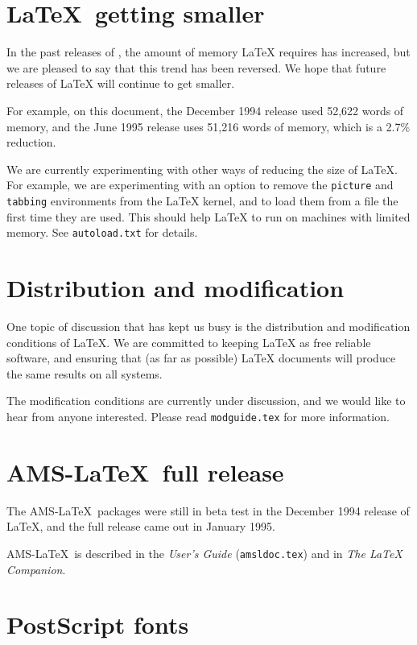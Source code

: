 \documentclass{ltnews}
\providecommand\env[1]{\texttt{#1}}
\providecommand\file[1]{\texttt{#1}}
\begin{document}
\section{\LaTeX\ getting smaller}

In the past releases of \LaTeXe, the amount of memory \LaTeX{}
requires has increased, but we are pleased to say that this trend has
been reversed.  We hope that future releases of \LaTeX{} will continue
to get smaller.

For example, on this document, the December 1994 release used 52,622
words of memory, and the June 1995 release uses 51,216 words of
memory, which is a 2.7\% reduction.

We are currently experimenting with other ways of reducing the size of
\LaTeX.  For example, we are experimenting with an option to remove
the \env{picture} and \env{tabbing} environments from the
\LaTeX{} kernel, and to load them from a file the first time they are
used.  This should help \LaTeX{} to run on machines with limited
memory.  See \file{autoload.txt} for details.

\section{Distribution and modification}

One topic of discussion that has kept us busy is the distribution and
modification conditions of \LaTeX.  We are committed to keeping
\LaTeX{} as free reliable software, and ensuring that (as far as
possible) \LaTeX{} documents will produce the same results on all
systems.

The modification conditions are currently under discussion, and we
would like to hear from anyone interested.  Please read
\file{modguide.tex} for more information.

\section{AMS-\LaTeX\ full release}

The AMS-\LaTeX\ packages were still in beta test in the December 1994
release of \LaTeX, and the full release came out in January 1995.

AMS-\LaTeX\ is described in the \emph{User's Guide}
(\file{amsldoc.tex}) and in \emph{The \LaTeX{} Companion}.

\section{PostScript fonts}
\end{document}
